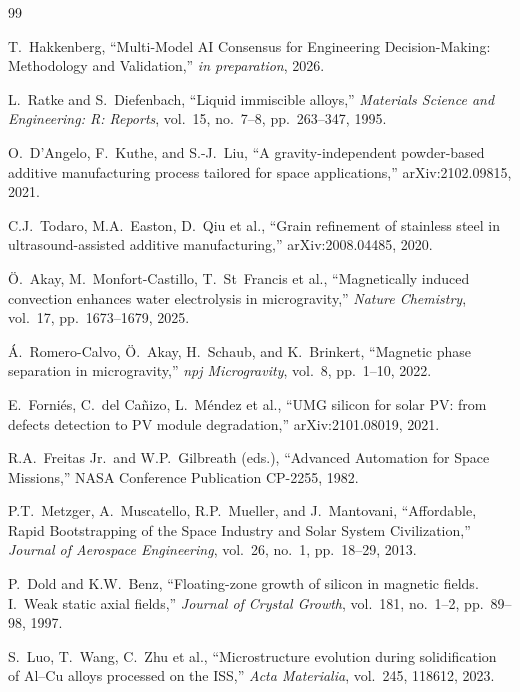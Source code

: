 \documentclass[preprint,12pt]{elsarticle}
\begin{document}
\begin{thebibliography}{99}

T.\ Hakkenberg, ``Multi-Model AI Consensus for Engineering Decision-Making: Methodology and Validation,'' \textit{in preparation}, 2026.

L.\ Ratke and S.\ Diefenbach, ``Liquid immiscible alloys,'' \textit{Materials Science and Engineering: R: Reports}, vol.~15, no.~7--8, pp.~263--347, 1995.

O.\ D'Angelo, F.\ Kuthe, and S.-J.\ Liu, ``A gravity-independent powder-based additive manufacturing process tailored for space applications,'' arXiv:2102.09815, 2021.

C.J.\ Todaro, M.A.\ Easton, D.\ Qiu et al., ``Grain refinement of stainless steel in ultrasound-assisted additive manufacturing,'' arXiv:2008.04485, 2020.

\"O.\ Akay, M.\ Monfort-Castillo, T.\ St~Francis et al., ``Magnetically induced convection enhances water electrolysis in microgravity,'' \textit{Nature Chemistry}, vol.~17, pp.~1673--1679, 2025.

\'A.\ Romero-Calvo, \"O.\ Akay, H.\ Schaub, and K.\ Brinkert, ``Magnetic phase separation in microgravity,'' \textit{npj Microgravity}, vol.~8, pp.~1--10, 2022.

E.\ Forni\'es, C.\ del Ca\~nizo, L.\ M\'endez et al., ``UMG silicon for solar PV: from defects detection to PV module degradation,'' arXiv:2101.08019, 2021.

R.A.\ Freitas Jr.\ and W.P.\ Gilbreath (eds.), ``Advanced Automation for Space Missions,'' NASA Conference Publication CP-2255, 1982.

P.T.\ Metzger, A.\ Muscatello, R.P.\ Mueller, and J.\ Mantovani, ``Affordable, Rapid Bootstrapping of the Space Industry and Solar System Civilization,'' \textit{Journal of Aerospace Engineering}, vol.~26, no.~1, pp.~18--29, 2013.

P.\ Dold and K.W.\ Benz, ``Floating-zone growth of silicon in magnetic fields. I.\ Weak static axial fields,'' \textit{Journal of Crystal Growth}, vol.~181, no.~1--2, pp.~89--98, 1997.

S.\ Luo, T.\ Wang, C.\ Zhu et al., ``Microstructure evolution during solidification of Al--Cu alloys processed on the ISS,'' \textit{Acta Materialia}, vol.~245, 118612, 2023.


\end{thebibliography}
\end{document}
